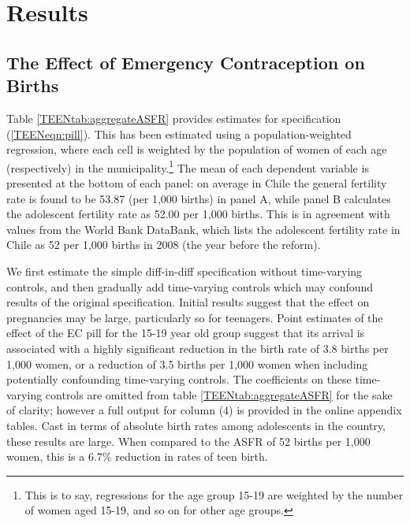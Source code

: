 \section{Results}
\label{TEENscn:results}
\subsection{The Effect of Emergency Contraception on Births}
\label{TEENsscn:rbirths}
Table \ref{TEENtab:aggregateASFR} provides estimates for specification 
(\ref{TEENeqn:pill}).  This has been estimated using a population-weighted 
regression, where each cell is weighted by the population of women of each age
(respectively) in the municipality.\footnote{This is to say, regressions for
the age group 15-19 are weighted by the number of women aged 15-19, and so on
for other age groups.} The mean of each dependent variable is presented at the 
bottom of each panel: on average in Chile the general fertility rate is found
to be 53.87 (per 1,000 births) in panel A, while panel B calculates the 
adolescent fertility rate as 52.00 per 1,000 births.  This is in agreement
with values from the World Bank DataBank, which lists the adolescent fertility
rate in Chile as 52 per 1,000 births in 2008 (the year before the reform).

We first estimate the simple diff-in-diff specification without time-varying 
controls, and then gradually add time-varying controls which may confound results 
of the original specification.  Initial results suggest that the effect on 
pregnancies may be large, particularly so for teenagers.  Point estimates of the
effect of the EC pill for the 15-19 year old group suggest that its arrival is 
associated with a highly significant reduction in the birth rate of 3.8 births 
per 1,000 women, or a reduction of 3.5 births per 1,000 women when including 
potentially confounding time-varying controls.  The coefficients on these 
time-varying controls are omitted from table \ref{TEENtab:aggregateASFR} for the
sake of clarity; however a full output for column (4) is provided in the online
appendix tables.  Cast in terms of absolute birth rates among adolescents in the
country, these results are large.  When compared to the ASFR of 52 births per
1,000 women, this is a 6.7\% reduction in rates of teen birth.


